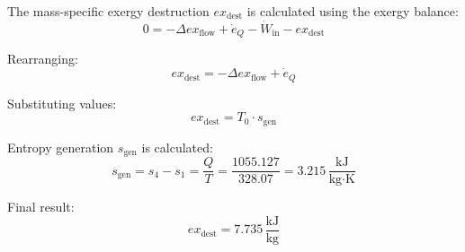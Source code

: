 The mass-specific exergy destruction \( ex_{\text{dest}} \) is calculated using the exergy balance:  
\[
0 = -\Delta ex_{\text{flow}} + \dot{e}_Q - \dot{W}_{\text{in}} - ex_{\text{dest}}
\]  

Rearranging:  
\[
ex_{\text{dest}} = -\Delta ex_{\text{flow}} + \dot{e}_Q
\]  

Substituting values:  
\[
ex_{\text{dest}} = T_0 \cdot s_{\text{gen}}
\]  

Entropy generation \( s_{\text{gen}} \) is calculated:  
\[
s_{\text{gen}} = s_4 - s_1 = \frac{Q}{T} = \frac{1055.127}{328.07} = 3.215 \, \frac{\text{kJ}}{\text{kg·K}}
\]  

Final result:  
\[
ex_{\text{dest}} = 7.735 \, \frac{\text{kJ}}{\text{kg}}
\]